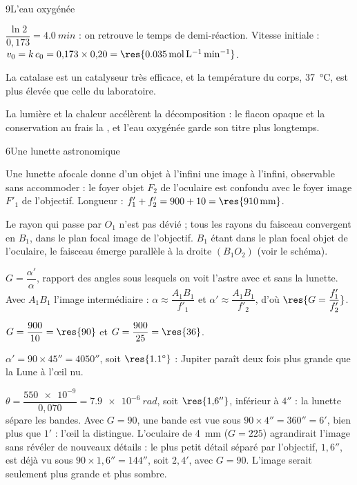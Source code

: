\begin{corrigeBac}{9}{L'eau oxygénée}
\begin{questions}[resume]
\item $\dfrac{\ln2}{0{,}173}=\qty{4,0}{min}$ : on retrouve le temps de demi-réaction. Vitesse initiale :
$v_0=k\,c_0=0{,}173\times0{,}20=\res{\qty{0,035}{mol.L^{-1}.min^{-1}}}$. 
\item La catalase est un catalyseur  très efficace, et la température du corps, \qty{37}{\degreeCelsius}, est plus
élevée que celle du laboratoire. 
\item La lumière et la chaleur accélèrent la décomposition : le flacon opaque et la conservation au frais la
, et l'eau oxygénée garde son titre plus longtemps. 
\end{questions}
\end{corrigeBac}

\begin{corrigeBac}{6}{Une lunette astronomique}
\begin{questions}
\item Une lunette afocale donne d'un objet à l'infini une image à l'infini, observable sans accommoder : le foyer objet
$F_2$ de l'oculaire est confondu avec le foyer image $F'_1$ de l'objectif. Longueur : $f'_1+f'_2=900+10=\res{\qty{910}{mm}}$. \pts{1 pt}
\item Le rayon qui passe par $O_1$ n'est pas dévié ; tous les rayons du faisceau convergent en $B_1$, dans le plan focal
image de l'objectif. $B_1$ étant dans le plan focal objet de l'oculaire, le faisceau émerge parallèle à la droite $(B_1O_2)$
(voir le schéma). 
\item $G=\dfrac{\alpha'}{\alpha}$, rapport des angles sous lesquels on voit l'astre avec et sans la lunette. Avec $A_1B_1$ l'image
intermédiaire : $\alpha\approx\dfrac{A_1B_1}{f'_1}$ et $\alpha'\approx\dfrac{A_1B_1}{f'_2}$, d'où $\res{G=\dfrac{f'_1}{f'_2}}$. \pts{1 pt}
\item $G=\dfrac{900}{10}=\res{90}$ et $G=\dfrac{900}{25}=\res{36}$. 
\item $\alpha'=90\times45''=4050''$, soit $\res{\ang{1,1}}$ : Jupiter paraît deux fois plus grande que la Lune à l'œil nu. 
\item $\theta=\dfrac{\num{550e-9}}{0{,}070}=\qty{7,9e-6}{rad}$, soit $\res{1{,}6''}$, inférieur à $4''$ : la lunette sépare les bandes. Avec $G=90$, une bande
est vue sous $90\times4''=360''=6'$, bien plus que $1'$ : l'œil la distingue. L'oculaire de \qty{4}{mm} ($G=225$) agrandirait
l'image sans révéler de nouveaux détails : le plus petit détail séparé par l'objectif, $1{,}6''$, est déjà vu sous
$90\times1{,}6''=144''$, soit $2{,}4'$, avec $G=90$. L'image serait seulement plus grande et plus sombre. 
\end{questions}
\end{corrigeBac}


